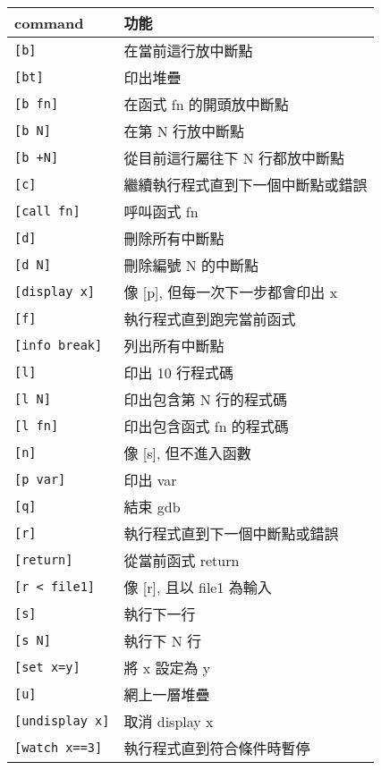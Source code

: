 \begin{tabular}[c]{|l|l|}
    \hline
    command             & 功能 \\
    \hline
    \verb|[b]|          & 在當前這行放中斷點 \\
    \verb|[bt]|         & 印出堆疊 \\
    \verb|[b fn]|       & 在函式 fn 的開頭放中斷點 \\
    \verb|[b N]|        & 在第 N 行放中斷點 \\
    \verb|[b +N]|       & 從目前這行屬往下 N 行都放中斷點 \\
    \verb|[c]|          & 繼續執行程式直到下一個中斷點或錯誤 \\
    \verb|[call fn]|    & 呼叫函式 fn \\
    \verb|[d]|          & 刪除所有中斷點 \\
    \verb|[d N]|        & 刪除編號 N 的中斷點 \\
    \verb|[display x]|  & 像 [p], 但每一次下一步都會印出 x \\
    \verb|[f]|          & 執行程式直到跑完當前函式 \\
    \verb|[info break]| & 列出所有中斷點 \\
    \verb|[l]|          & 印出 10 行程式碼  \\
    \verb|[l N]|        & 印出包含第 N 行的程式碼  \\
    \verb|[l fn]|       & 印出包含函式 fn 的程式碼 \\
    \verb|[n]|          & 像 [s], 但不進入函數 \\
    \verb|[p var]|      & 印出 var \\
    \verb|[q]|          & 結束 gdb \\
    \verb|[r]|          & 執行程式直到下一個中斷點或錯誤 \\
    \verb|[return]|     & 從當前函式 return \\
    \verb|[r < file1]|  & 像 [r], 且以 file1 為輸入 \\
    \verb|[s]|          & 執行下一行 \\
    \verb|[s N]|        & 執行下 N 行 \\
    \verb|[set x=y]|    & 將 x 設定為 y \\
    \verb|[u]|          & 網上一層堆疊 \\
    \verb|[undisplay x]| & 取消 display x \\
    \verb|[watch x==3]| & 執行程式直到符合條件時暫停 \\
    \hline
\end{tabular}